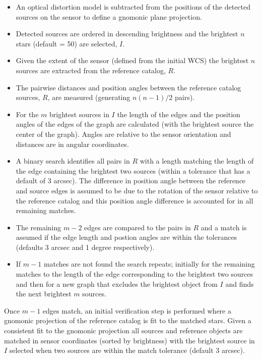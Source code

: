 \begin{itemize}
\item An optical distortion model is subtracted from the positions of
  the detected sources on the sensor to define a gnomonic plane projection.
\item Detected sources are ordered in descending brightness and the
  brightest $n$ stars (default = 50) are selected, $I$.
\item Given the extent of the sensor (defined from the initial WCS)
  the brightest $n$ sources are extracted from the reference catalog, $R$.
\item The pairwise distances and position angles between the reference
  catalog sources, $R$, are measured (generating $n(n-1)/2$ pairs).
\item For the $m$ brightest sources in $I$ the length of the edges and
  the position angles of the edges of the graph are calculated (with
  the brightest source the center of the graph). Angles are relative
  to the sensor orientation and distances are in angular coordinates.
\item A binary search identifies all pairs in $R$ with a length
  matching the length of the edge containing the brightest two sources
  (within a tolerance that has a default of 3 arcsec).  The difference
  in position angle between the reference and source edges is assumed
  to be due to the rotation of the sensor relative to the reference
  catalog and this position angle difference is accounted for in all
  remaining matches.
\item The remaining $m-2$ edges are compared to the pairs in $R$ and a
  match is assumed if the edge length and postion angles are within
  the tolerances (defaults 3 arcsec and 1 degree respectively).
\item If $m-1$ matches are not found the search repeats; initially for
  the remaining matches to the length of the edge corresponding to the
  brightest two sources and then for a new graph that excludes the
  brightest object from $I$ and finds the next brightest $m$ sources.
\end{itemize} 

Once $m-1$ edges match, an initial verification step is performed where a gnomonic projection of the reference catalog is fit to the matched stars. Given a consistent fit to the gnomonic projection all sources and reference objects are matched in sensor coordinates (sorted by brightness) with the brightest source in $I$ selected when two sources are within the match tolerance (default 3 arcsec). 

